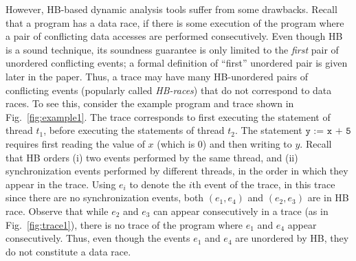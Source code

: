

However, HB-based dynamic analysis tools suffer from some
drawbacks. Recall that a program has a data race, if there is some
execution of the program where a pair of conflicting data accesses are performed
consecutively. Even though HB is a sound technique, its soundness
guarantee is only limited to the \emph{first} pair of unordered
conflicting events; a formal definition of ``first'' unordered pair is
given later in the paper. Thus, a trace may have many HB-unordered
pairs of conflicting events (popularly called \emph{HB-races}) that do
not correspond to data races. To see this, consider the example
program and trace shown in Fig.~\ref{fig:example1}. The trace
corresponds to first executing the statement of thread $t_1$, before
executing the statements of thread $t_2$.  The statement $\texttt{y :=
x + 5}$ requires first reading the value of $x$ (which is $0$) and
then writing to $y$. Recall that HB orders (i) two events performed by
the same thread, and (ii) synchronization events performed by
different threads, in the order in which they appear in the
trace. Using $e_i$ to denote the $i$th event of the trace, in this
trace since there are no synchronization events, both $(e_1,e_4)$ and
$(e_2,e_3)$ are in HB race. Observe that while $e_2$ and $e_3$ can
appear consecutively in a trace (as in Fig.~\ref{fig:trace1}), there
is no trace of the program where $e_1$ and $e_4$ appear
consecutively. Thus, even though the events $e_1$ and $e_4$ are
unordered by HB,
they do not constitute a data race.



